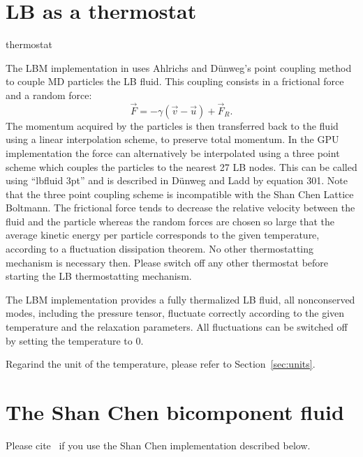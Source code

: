 \section{LB as a thermostat}
\begin{essyntax}
  thermostat  
  \begin{features}
  \end{features}
\end{essyntax}
The LBM implementation in \es uses Ahlrichs and D\"unweg's point coupling method
to couple MD particles the LB fluid. This coupling consists
in a frictional force and a random force:
\begin{equation*}
  \vec{F} = -\gamma \left(\vec{v}-\vec{u}\right) + \vec{F}_R.
\end{equation*}
The momentum acquired by the particles is then transferred back to the fluid
using a linear interpolation scheme, to preserve total momentum.  In the GPU
implementation the force can alternatively be interpolated using a three point
scheme which couples the particles to the nearest 27 LB nodes.  This can be
called using ``lbfluid  3pt'' and is described in D\"{u}nweg and
Ladd by equation 301\cite{duenweg08a}. Note that the three point coupling
scheme is incompatible with the Shan Chen Lattice Boltmann.  The frictional
force tends to decrease the relative velocity between the fluid and the
particle whereas the random forces are chosen so large that the average kinetic
energy per particle corresponds to the given temperature, according to a
fluctuation dissipation theorem.  No other thermostatting mechanism is
necessary then. Please switch off any other thermostat before starting the LB
thermostatting mechanism.

The LBM implementation provides a fully thermalized LB fluid, \ie all
nonconserved modes, including the pressure tensor, fluctuate correctly
according to the given temperature and the relaxation parameters. All
fluctuations can be switched off by setting the temperature to 0.

Regarind the unit of the temperature, please refer to
Section~\ref{sec:units}.

\section{The Shan Chen bicomponent fluid\label{sec:shanchen}}
\begin{citebox}
  Please cite~ if you use the Shan Chen implementation
  described below.
\end{citebox}


